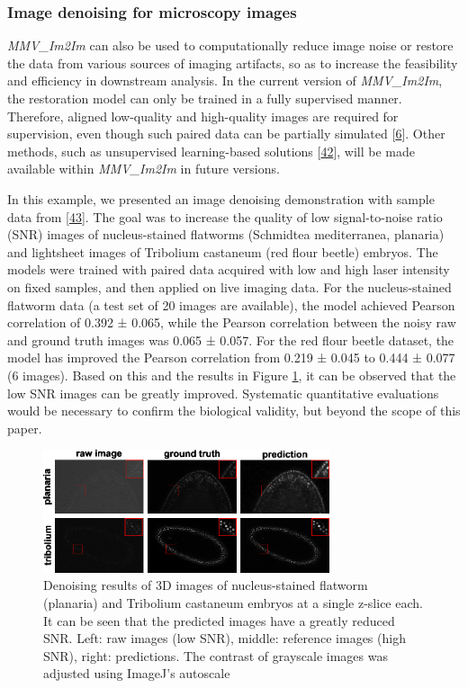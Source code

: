 \hypertarget{image-denoising-for-microscopy-images}{%
\subsubsection{Image denoising for microscopy images}\label{image-denoising-for-microscopy-images}}

\emph{MMV\_Im2Im} can also be used to computationally reduce image noise or restore the data from various sources of imaging artifacts, so as to increase the feasibility and efficiency in downstream analysis. In the current version of \emph{MMV\_Im2Im}, the restoration model can only be trained in a fully supervised manner. Therefore, aligned low-quality and high-quality images are required for supervision, even though such paired data can be partially simulated {[}\protect\hyperlink{ref-wcCVn8av}{6}{]}. Other methods, such as unsupervised learning-based solutions {[}\protect\hyperlink{ref-4vnyY9J9}{42}{]}, will be made available within \emph{MMV\_Im2Im} in future versions.

In this example, we presented an image denoising demonstration with sample data from {[}\protect\hyperlink{ref-12G712Zky}{43}{]}. The goal was to increase the quality of low signal-to-noise ratio (SNR) images of nucleus-stained flatworms (Schmidtea mediterranea, planaria) and lightsheet images of Tribolium castaneum (red flour beetle) embryos. The models were trained with paired data acquired with low and high laser intensity on fixed samples, and then applied on live imaging data. For the nucleus-stained flatworm data (a test set of 20 images are available), the model achieved Pearson correlation of 0.392 ± 0.065, while the Pearson correlation between the noisy raw and ground truth images was 0.065 ± 0.057. For the red flour beetle dataset, the model has improved the Pearson correlation from 0.219 ± 0.045 to 0.444 ± 0.077 (6 images). Based on this and the results in Figure \ref{fig:denoising}, it can be observed that the low SNR images can be greatly improved. Systematic quantitative evaluations would be necessary to confirm the biological validity, but beyond the scope of this paper.

\begin{figure}
\hypertarget{fig:denoising}{%
\centering
\includegraphics[width=0.75\textwidth,height=\textheight]{images/denoising_justin.png}
\caption{Denoising results of 3D images of nucleus-stained flatworm (planaria) and Tribolium castaneum embryos at a single z-slice each. It can be seen that the predicted images have a greatly reduced SNR. Left: raw images (low SNR), middle: reference images (high SNR), right: predictions. The contrast of grayscale images was adjusted using ImageJ's autoscale}\label{fig:denoising}
}
\end{figure}


